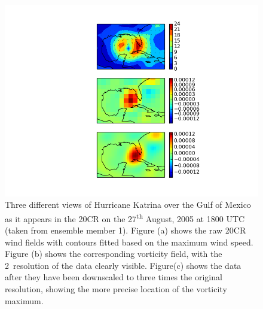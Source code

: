 \documentclass[pdftex,12pt,a4paper]{report}
\newcommand{\ts}{\textsuperscript}
\begin{document}
\begin{figure}[hb!]
    \centering
    \includegraphics[width=\textwidth]{figures/katrina_data_proc}
    \caption{Three different views of Hurricane Katrina over the Gulf of Mexico as it appears in the
        20CR on the 27\ts{th} August, 2005 at 1800 UTC (taken from ensemble member 1). Figure (a)
        shows the raw 20CR wind fields with contours fitted based on the maximum wind speed. Figure
        (b) shows the corresponding vorticity field, with the 2\textdegree\ resolution of the data
        clearly visible. Figure(c) shows the data after they have been downscaled to three times the
        original resolution, showing the more precise location of the vorticity maximum.}
    \label{fig:katrina_data_proc}
\end{figure}
\end{document}
